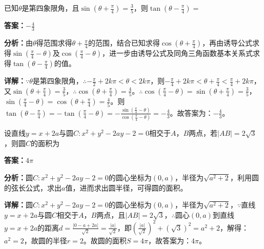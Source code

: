 \begin{question}[points=5]
已知$\theta$是第四象限角，且$\sin(\theta+\frac{\pi}{4})=\frac{3}{5}$，则$\tan(\theta-\frac{\pi}{4})=$
\fillin[{$-\frac{4}{3}$}]
\begin{solution}
\textbf{答案：}$-\frac{4}{3}$

\textbf{分析：}由$\theta$得范围求得$\theta+\frac{\pi}{4}$的范围，结合已知求得$\cos(\theta+\frac{\pi}{4})$，再由诱导公式求得$\sin(\frac{\pi}{4}-\theta)$及$\cos(\frac{\pi}{4}-\theta)$，进一步由诱导公式及同角三角函数基本关系式求得$\tan(\theta-\frac{\pi}{4})$的值。

\textbf{详解：}$\because\theta$是第四象限角，$\therefore -\frac{\pi}{2}+2k\pi<\theta<2k\pi$，则$-\frac{\pi}{4}+2k\pi<\theta+\frac{\pi}{4}<\frac{\pi}{4}+2k\pi$，又$\sin(\theta+\frac{\pi}{4})=\frac{3}{5}$，$\therefore\cos(\theta+\frac{\pi}{4})=\frac{4}{5}$。$\therefore\cos(\frac{\pi}{4}-\theta)=\sin(\theta+\frac{\pi}{4})=\frac{3}{5}$，$\sin(\frac{\pi}{4}-\theta)=\cos(\theta+\frac{\pi}{4})=\frac{4}{5}$。则$\tan(\theta-\frac{\pi}{4})=-\tan(\frac{\pi}{4}-\theta)=-\frac{\sin(\frac{\pi}{4}-\theta)}{\cos(\frac{\pi}{4}-\theta)}=-\frac{4}{3}$。故答案为：$-\frac{4}{3}$。
\end{solution}
\end{question}

\begin{question}[points=5]
设直线$y=x+2a$与圆$C:x^2+y^2-2ay-2=0$相交于$A$，$B$两点，若$|AB|=2\sqrt{3}$，则圆$C$的面积为
\fillin[{$4\pi$}]
\begin{solution}
\textbf{答案：}$4\pi$

\textbf{分析：}圆$C:x^2+y^2-2ay-2=0$的圆心坐标为$(0,a)$，半径为$\sqrt{a^2+2}$，利用圆的弦长公式，求出$a$值，进而求出圆半径，可得圆的面积。

\textbf{详解：}圆$C:x^2+y^2-2ay-2=0$的圆心坐标为$(0,a)$，半径为$\sqrt{a^2+2}$，$\because$直线$y=x+2a$与圆$C$相交于$A$，$B$两点，且$|AB|=2\sqrt{3}$，$\therefore$圆心$(0,a)$到直线$y=x+2a$的距离$d=\frac{|0-a+2a|}{\sqrt{2}}=\frac{|a|}{\sqrt{2}}$，即$(\frac{|a|}{\sqrt{2}})^2+(\sqrt{3})^2=a^2+2$，解得：$a^2=2$，故圆的半径$r=2$。故圆的面积$S=4\pi$，故答案为：$4\pi$。
\end{solution}
\end{question}

